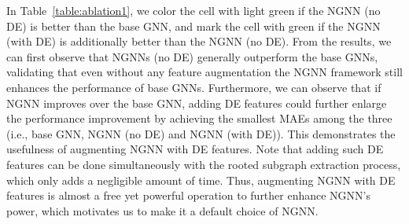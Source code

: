 \documentclass{article}
\begin{document}
In Table~\ref{table:ablation1}, we color the cell with light green if the NGNN (no DE) is better than the base GNN, and mark the cell with green if the NGNN (with DE) is additionally better than the NGNN (no DE). From the results, we can first observe that NGNNs (no DE) generally outperform the base GNNs, validating that even without any feature augmentation the NGNN framework still enhances the performance of base GNNs. Furthermore, we can observe that if NGNN improves over the base GNN, adding DE features could further enlarge the performance improvement by achieving the smallest MAEs among the three (i.e., base GNN, NGNN (no DE) and NGNN (with DE)). This demonstrates the usefulness of augmenting NGNN with DE features. Note that adding such DE features can be done simultaneously with the rooted subgraph extraction process, which only adds a negligible amount of time. Thus, augmenting NGNN with DE features is almost a free yet powerful operation to further enhance NGNN's power, which motivates us to make it a default choice of NGNN.
\end{document}
